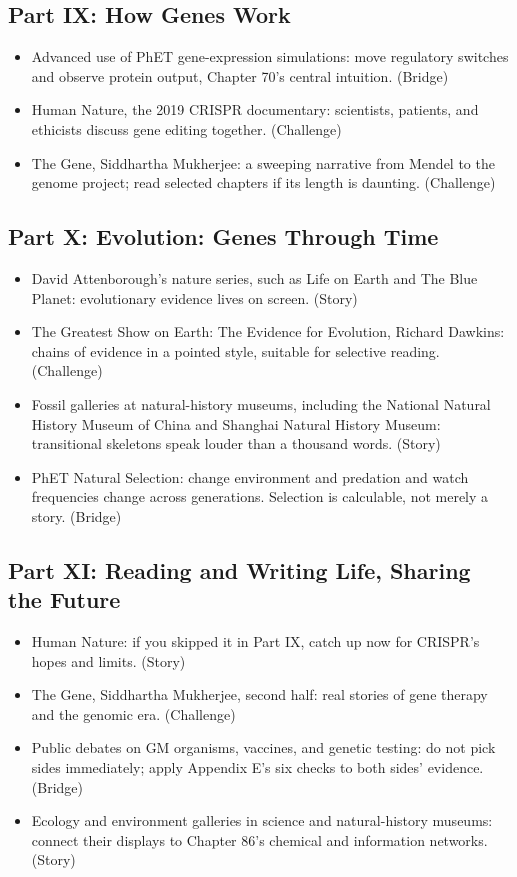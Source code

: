 \subsection*{Part IX: How Genes Work}

\begin{itemize}[itemsep=2pt]
\item Advanced use of PhET gene-expression simulations: move regulatory switches and observe protein output, Chapter 70's central intuition. (Bridge)
\item Human Nature, the 2019 CRISPR documentary: scientists, patients, and ethicists discuss gene editing together. (Challenge)
\item The Gene, Siddhartha Mukherjee: a sweeping narrative from Mendel to the genome project; read selected chapters if its length is daunting. (Challenge)
\end{itemize}

\subsection*{Part X: Evolution: Genes Through Time}

\begin{itemize}[itemsep=2pt]
\item David Attenborough's nature series, such as Life on Earth and The Blue Planet: evolutionary evidence lives on screen. (Story)
\item The Greatest Show on Earth: The Evidence for Evolution, Richard Dawkins: chains of evidence in a pointed style, suitable for selective reading. (Challenge)
\item Fossil galleries at natural-history museums, including the National Natural History Museum of China and Shanghai Natural History Museum: transitional skeletons speak louder than a thousand words. (Story)
\item PhET Natural Selection: change environment and predation and watch frequencies change across generations. Selection is calculable, not merely a story. (Bridge)
\end{itemize}

\subsection*{Part XI: Reading and Writing Life, Sharing the Future}

\begin{itemize}[itemsep=2pt]
\item Human Nature: if you skipped it in Part IX, catch up now for CRISPR's hopes and limits. (Story)
\item The Gene, Siddhartha Mukherjee, second half: real stories of gene therapy and the genomic era. (Challenge)
\item Public debates on GM organisms, vaccines, and genetic testing: do not pick sides immediately; apply Appendix E's six checks to both sides' evidence. (Bridge)
\item Ecology and environment galleries in science and natural-history museums: connect their displays to Chapter 86's chemical and information networks. (Story)
\end{itemize}

